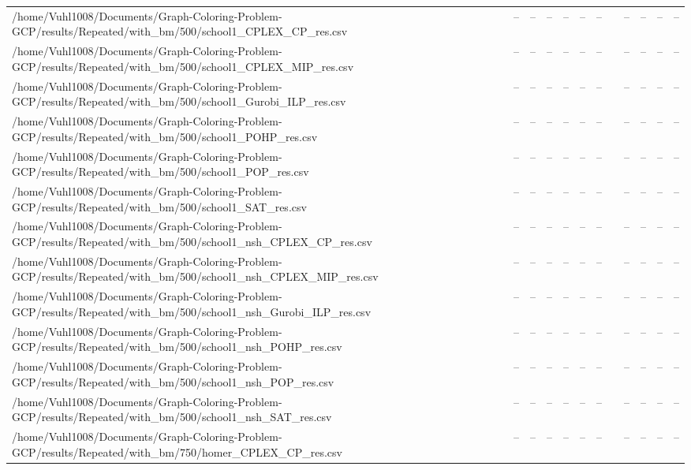 \begin{table}[htbp]
\begin{tabular}{llllllllllll}
/home/Vuhl1008/Documents/Graph-Coloring-Problem-GCP/results/Repeated/with\_bm/500/school1\_CPLEX\_CP\_res.csv & -- & -- & -- & -- & -- & -- & {} & -- & -- & -- & -- \\
/home/Vuhl1008/Documents/Graph-Coloring-Problem-GCP/results/Repeated/with\_bm/500/school1\_CPLEX\_MIP\_res.csv & -- & -- & -- & -- & -- & -- & {} & -- & -- & -- & -- \\
/home/Vuhl1008/Documents/Graph-Coloring-Problem-GCP/results/Repeated/with\_bm/500/school1\_Gurobi\_ILP\_res.csv & -- & -- & -- & -- & -- & -- & {} & -- & -- & -- & -- \\
/home/Vuhl1008/Documents/Graph-Coloring-Problem-GCP/results/Repeated/with\_bm/500/school1\_POHP\_res.csv & -- & -- & -- & -- & -- & -- & {} & -- & -- & -- & -- \\
/home/Vuhl1008/Documents/Graph-Coloring-Problem-GCP/results/Repeated/with\_bm/500/school1\_POP\_res.csv & -- & -- & -- & -- & -- & -- & {} & -- & -- & -- & -- \\
/home/Vuhl1008/Documents/Graph-Coloring-Problem-GCP/results/Repeated/with\_bm/500/school1\_SAT\_res.csv & -- & -- & -- & -- & -- & -- & {} & -- & -- & -- & -- \\
/home/Vuhl1008/Documents/Graph-Coloring-Problem-GCP/results/Repeated/with\_bm/500/school1\_nsh\_CPLEX\_CP\_res.csv & -- & -- & -- & -- & -- & -- & {} & -- & -- & -- & -- \\
/home/Vuhl1008/Documents/Graph-Coloring-Problem-GCP/results/Repeated/with\_bm/500/school1\_nsh\_CPLEX\_MIP\_res.csv & -- & -- & -- & -- & -- & -- & {} & -- & -- & -- & -- \\
/home/Vuhl1008/Documents/Graph-Coloring-Problem-GCP/results/Repeated/with\_bm/500/school1\_nsh\_Gurobi\_ILP\_res.csv & -- & -- & -- & -- & -- & -- & {} & -- & -- & -- & -- \\
/home/Vuhl1008/Documents/Graph-Coloring-Problem-GCP/results/Repeated/with\_bm/500/school1\_nsh\_POHP\_res.csv & -- & -- & -- & -- & -- & -- & {} & -- & -- & -- & -- \\
/home/Vuhl1008/Documents/Graph-Coloring-Problem-GCP/results/Repeated/with\_bm/500/school1\_nsh\_POP\_res.csv & -- & -- & -- & -- & -- & -- & {} & -- & -- & -- & -- \\
/home/Vuhl1008/Documents/Graph-Coloring-Problem-GCP/results/Repeated/with\_bm/500/school1\_nsh\_SAT\_res.csv & -- & -- & -- & -- & -- & -- & {} & -- & -- & -- & -- \\
/home/Vuhl1008/Documents/Graph-Coloring-Problem-GCP/results/Repeated/with\_bm/750/homer\_CPLEX\_CP\_res.csv & -- & -- & -- & -- & -- & -- & {} & -- & -- & -- & -- \\

\end{tabular}
\end{table}
